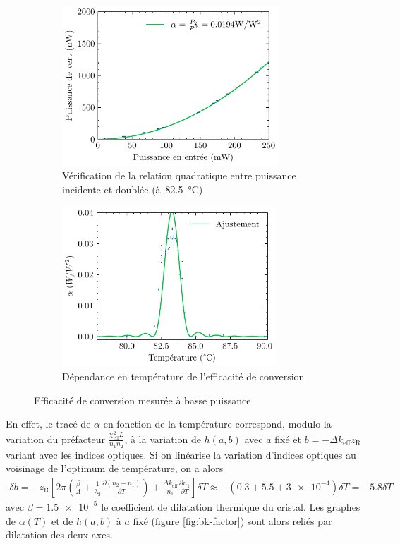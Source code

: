 \documentclass[11pt,a4paper] { article}
\newcommand{\pdv}[2]{\frac{\partial #1}{\partial #2}}
\newcommand{\zr}{z_\mathsc{R}}
\newcommand{\chie}{\chi_\mathsc{eff}}
\newcommand{\dke}{\Delta k_\mathsc{eff}}
\newcommand{\mathsc}[1]{\mathrm{\scriptscriptstyle {#1}}}
\begin{document}
\begin{figure}[htpb]
\centering
\hspace*{-0.4cm}
\begin{subfigure}[b]{0.45\textwidth}
    \centering
    \includegraphics[height=6cm]{../donnees/conversion basse puissance 82.5 C.pdf}
    \caption{Vérification de la relation quadratique entre puissance incidente et doublée {(à~\SI{82.5}{\celsius})}}
    \label{fig:quadra}
\end{subfigure}
\hspace*{0.4cm}
\begin{subfigure}[b]{0.48\textwidth}
	\centering
	\includegraphics[height=6cm]{./img/alpha bp.pdf}
	\caption{Dépendance en température de l'efficacité de conversion}
	\label{fig:alphabp}
\end{subfigure}
\caption{Efficacité de conversion mesurée à basse puissance}
\end{figure}

En effet, le tracé de $\alpha$ en fonction de la température correspond, modulo la variation du préfacteur $\frac{\chie^2 L}{n_1 n_2}$, à la variation de $h(a,b)$ avec $a$ fixé et $b=-\Delta k_\mathsc{eff} \zr$ variant avec les indices optiques. Si on linéarise la variation d'indices optiques au voisinage de l'optimum de température, on a alors 
\begin{align}
	\delta b = - \zr \left[ 2\pi \left( \frac{\beta}{\Lambda} + \frac{1}{\lambda_2} \pdv{(n_2-n_1)}{T}  \right) + \frac{\dke}{n_1} \pdv{n_1}{T} \right] \delta T \approx -\left(0.3+5.5+\num{3e-4}\right) \delta T = - 5.8 \delta T
\end{align}
avec $\beta = \num{1.5e-5}$ le coefficient de dilatation thermique du cristal.
Les graphes de $\alpha(T)$ et de $h(a,b)$ à $a$ fixé (figure \ref{fig:bk-factor}) sont alors reliés par dilatation des deux axes.
\end{document}
